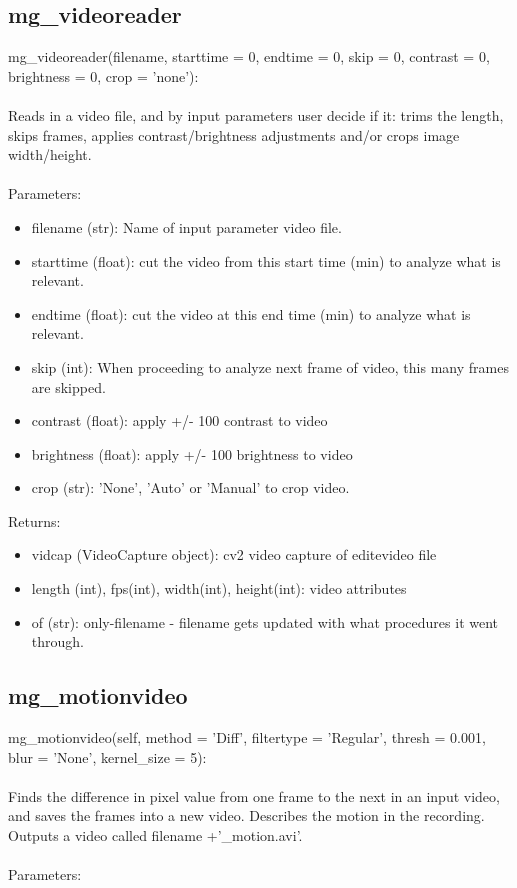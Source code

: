 \documentclass[9pt]{extarticle}
\begin{document}
\subsection{mg\_videoreader}
    mg\_videoreader(filename, starttime = 0, endtime = 0, skip = 0, contrast = 0, brightness = 0, crop = 'none'):
    \\\\
    Reads in a video file, and by input parameters user decide if it: trims the length, skips frames, applies contrast/brightness adjustments and/or crops image width/height.
    \\\\
    Parameters:
    \begin{itemize}
     \item [] filename (str): Name of input parameter video file.
     \item [] starttime (float): cut the video from this start time (min) to analyze what is relevant.
     \item [] endtime (float): cut the video at this end time (min) to analyze what is relevant.
     \item [] skip (int): When proceeding to analyze next frame of video, this many frames are skipped.
     \item [] contrast (float): apply +/- 100 contrast to video
     \item [] brightness (float): apply +/- 100 brightness to video
     \item [] crop (str): 'None', 'Auto' or 'Manual' to crop video.
    \end{itemize}
    Returns:
    \begin{itemize}
    \item [] vidcap (VideoCapture object): cv2 video capture of editevideo file
    \item [] length (int), fps(int), width(int), height(int): video attributes
     \item [] of (str): only-filename - filename gets updated with what procedures it went through.
 \end{itemize}

\subsection{mg\_motionvideo}    
    mg\_motionvideo(self, method = 'Diff', filtertype = 'Regular', thresh = 0.001, blur = 'None', kernel\_size = 5):
    \\\\
    Finds the difference in pixel value from one frame to the next in an input video, and saves the frames into a new video.
    Describes the motion in the recording.    
    Outputs a video called filename +'\_motion.avi'.
    \\\\
    Parameters:
    
\end{document}
